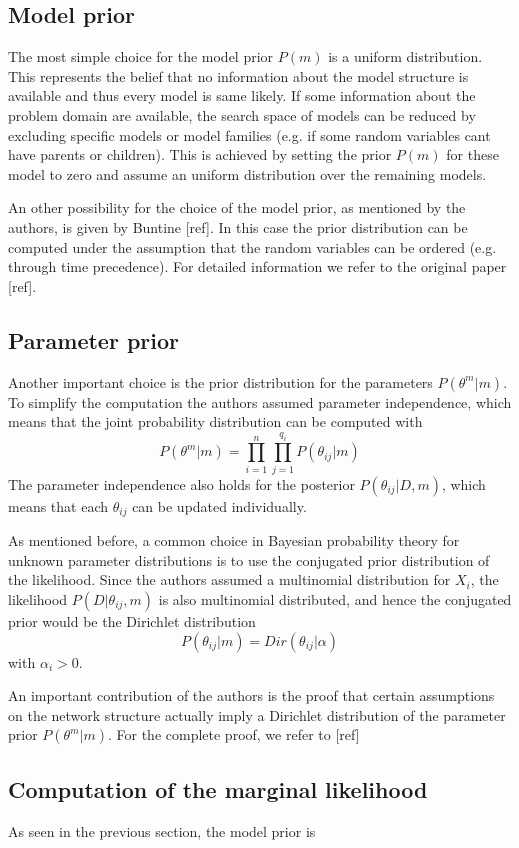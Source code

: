 \documentclass{article}
\begin{document}
	\subsection{Model prior}
	The most simple choice for the model prior $P(m)$ is a uniform distribution. This represents 
	the belief that no information about the model structure is	available and thus every 
	model is same likely. If some information about the problem domain are available, the search space 
	of models can be reduced by excluding specific models or model families (e.g. if some random
	variables cant have parents or children). This is achieved by setting
	the prior $P(m)$ for these model to zero and assume an uniform distribution over the remaining
	models.	
	
	An other possibility for the choice of the model prior, as mentioned by the authors, is given
	by Buntine [ref]. In this case the prior distribution can be computed under the assumption that
	the random variables can be ordered (e.g. through time precedence). For detailed information we
	refer to the original paper [ref].
	
	\subsection{Parameter prior}
	Another important choice is the prior distribution for the parameters $P(\theta^m|m)$. To simplify
	the computation the authors assumed parameter independence, which means that the joint probability
	distribution can be computed with
	\[
		P(\theta^m|m)= \prod_{i=1}^n \prod_{j=1}^{q_i} P(\theta_{ij}|m)
	\]
	The parameter independence also holds for the posterior $P(\theta_{ij}|D,m)$, which means
	that each $\theta_{ij}$ can be updated individually.
	
	As mentioned before, a common choice in Bayesian probability theory for unknown parameter distributions
	is to use the conjugated prior distribution of the likelihood.
	Since the authors assumed a multinomial distribution
	for $X_i$, the likelihood $P(D|\theta_{ij},m)$ is also multinomial distributed, and hence the
	conjugated prior would be the Dirichlet distribution
	\[
		P(\theta_{ij}|m) = Dir(\theta_{ij}|\alpha)
	\]
	with $\alpha_i > 0$.
	
	An important contribution of the authors is the proof that certain assumptions on the network
	structure actually imply a Dirichlet distribution of the parameter prior $P(\theta^m|m)$.
	For the complete proof, we refer to [ref]
	
	\subsection{Computation of the marginal likelihood}
	As seen in the previous section, the model prior is 
	
\end{document}
